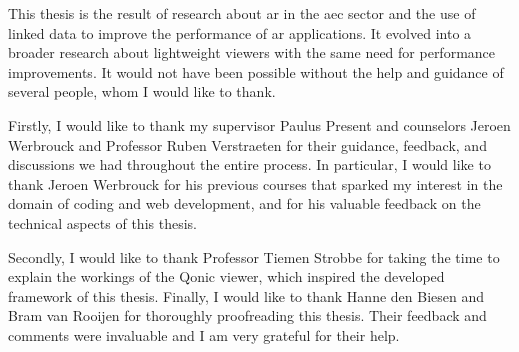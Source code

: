 {\huge{}}

This thesis is the result of research about \ac{ar} in the \ac{aec} sector and the use of linked data to improve the performance of \ac{ar} applications. It evolved into a broader research about lightweight viewers with the same need for performance improvements. It would not have been possible without the help and guidance of several people, whom I would like to thank.

Firstly, I would like to thank my supervisor Paulus Present and counselors Jeroen Werbrouck and Professor Ruben Verstraeten for their guidance, feedback, and discussions we had throughout the entire process. In particular, I would like to thank Jeroen Werbrouck for his previous courses that sparked my interest in the domain of coding and web development, and for his valuable feedback on the technical aspects of this thesis.

Secondly, I would like to thank Professor Tiemen Strobbe for taking the time to explain the workings of the Qonic viewer, which inspired the developed framework of this thesis. Finally, I would like to thank Hanne den Biesen and Bram van Rooijen for thoroughly proofreading this thesis. Their feedback and comments were invaluable and I am very grateful for their help.